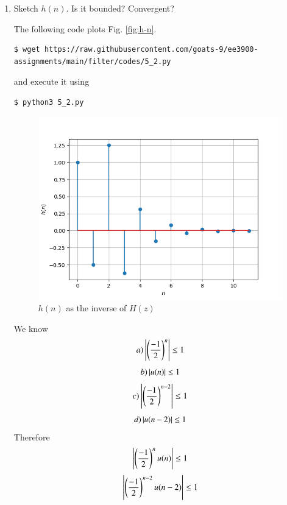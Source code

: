 \documentclass[journal,12pt,twocolumn]{IEEEtran}
\renewcommand\thesection{\arabic{section}}
\begin{document}
\begin{enumerate}[label=\thesection.\arabic*]
\item Sketch $h(n)$. Is it bounded? Convergent? 

\solution The following code plots Fig. \eqref{fig:h-n}.
\begin{lstlisting}
$ wget https://raw.githubusercontent.com/goats-9/ee3900-assignments/main/filter/codes/5_2.py
\end{lstlisting}
and execute it using
\begin{lstlisting}
$ python3 5_2.py
\end{lstlisting}

\begin{figure}[!ht]
	\centering
	\includegraphics[width=\columnwidth]{Figures/Q5/5__2.png}
	\caption{$h(n)$ as the inverse of $H(z)$}
	\label{fig:h-n}
\end{figure}
We know 
\begin{equation}
 a)   \left\vert\left( \frac{-1}{2}\right)^n\right\vert \leq 1
\end{equation}
\begin{equation}
 b)   \left\vert u(n)\right\vert \leq 1
\end{equation}
\begin{equation}
 c)   \left\vert\left( \frac{-1}{2}\right)^{n-2}\right\vert \leq 1
\end{equation}
\begin{equation}
 d)   \left\vert u(n-2)\right\vert \leq 1
\end{equation}
Therefore 
\begin{equation}
    \left\vert\left( \frac{-1}{2}\right)^n u(n)\right\vert \leq 1
\end{equation}
\begin{equation}
    \left\vert\left( \frac{-1}{2}\right)^{n-2} u(n-2)\right\vert \leq 1
\end{equation}


\end{enumerate}
\end{document}
